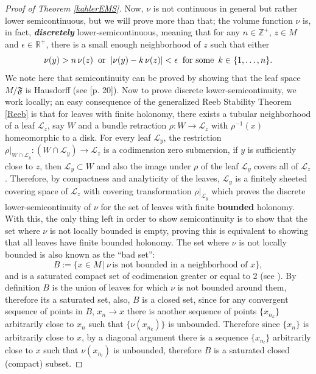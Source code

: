 \documentclass[12pt,twoside,a4paper]{report}
\newcommand{\zah}{\ensuremath{ \mathbb Z }}
\newcommand{\re}{\ensuremath{\mathbb R }}
\begin{document}
\begin{proof}[Proof of Theorem \ref{kahlerEMS}]
  Now, $\nu$ is not continuous in general but rather lower semicontinuous, but we will prove more than that;
  the volume function $\nu$ is, in fact, \textbf{\emph{discretely}} lower-semicontinuous, meaning that for any
  $n\in\zah^+$, $z\in M$ and $\epsilon\in\re^+$, there is a small enough
  neighborhood of $z$ such that either
  \[
    \nu(y)>n\,\nu(z)\hspace{0.2cm}\text{or}\hspace{0.2cm}|\nu(y)-k\,\nu(z)|<\epsilon \hspace{0.2cm}\text{for some }\,k\in\lbrace 1,\ldots,n\rbrace.
  \]
  We note here that semicontinuity can be proved by showing that the leaf space $M/\mathfrak{F}$ is Hausdorff (see \cite{EMS}[p. 20]).
  Now to prove discrete lower-semicontinuity, we work locally; an easy consequence of the generalized Reeb Stability Theorem \ref{Reeb} is that for leaves with finite holonomy, there exists a tubular neighborhood of a leaf $\mathcal{L}_z$, say $W$ and a bundle retraction $\rho: W\rightarrow\mathcal{L}_z$ with $\rho^{-1}(x)$ homeomorphic to a disk.
  For every leaf $\mathcal{L}_y$, the restriction $\rho|_{W\cap\mathcal{L}_y}:(W\cap\mathcal{L}_y)\rightarrow\mathcal{L}_z$ is a codimension zero submersion, if $y$ is sufficiently close to $z$, then $\mathcal{L}_y\subset W$ and also the image under $\rho$ of the leaf $\mathcal{L}_y$ covers all of $\mathcal{L}_z$.
  Therefore, by compactness and analyticity of the leaves, $\mathcal{L}_y$ is a finitely sheeted covering space of $\mathcal{L}_z$ with covering transformation $\rho|_{\mathcal{L}_y}$ which proves the discrete lower-semicontinuity of $\nu$ for the set of leaves with finite \textbf{bounded} holonomy.
  With this, the only thing left in order to show semicontinuity is to show that the set where $\nu$ is not locally bounded is empty, proving this is equivalent to showing that all leaves have finite bounded holonomy. The set where $\nu$ is not locally bounded is also known as the ``bad set'':
  \[
      B:=\lbrace x\in M\,|\, \nu\,\text{is not bounded in a neighborhood of }x\rbrace,
  \]
  and is a saturated compact set of codimension greater or equal to 2 (see \cite{Epstein}).
  By definition $B$ is the union of leaves for which $\nu$ is not bounded around them, therefore its a saturated set, also, $B$ is a closed set, since for any convergent sequence of points in $B$, \(x_n\rightarrow x\) there is another sequence of points $\{x_{n_k}\}$ arbitrarily close to $x_n$ such that $\{\nu(x_{n_k})\}$ is unbounded.
  Therefore since $\{x_n\}$ is arbitrarily close to $x$, by a diagonal argument there is a sequence $\{x_{n_l}\}$ arbitrarily close to $x$ such that $\nu(x_{n_l})$ is unbounded, therefore $B$ is a saturated closed (compact) subset.

\end{proof}
\end{document}
